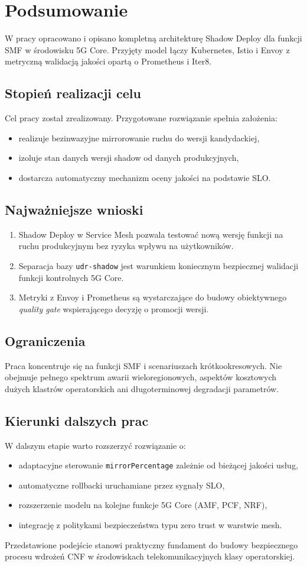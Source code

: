 \chapter{Podsumowanie}
\label{chap:podsumowanie}
W pracy opracowano i opisano kompletną architekturę Shadow Deploy dla funkcji SMF w środowisku 5G Core. Przyjęty model łączy Kubernetes, Istio i Envoy z metryczną walidacją jakości opartą o Prometheus i Iter8.

\section{Stopień realizacji celu}
Cel pracy został zrealizowany. Przygotowane rozwiązanie spełnia założenia:
\begin{itemize}
    \item realizuje bezinwazyjne mirrorowanie ruchu do wersji kandydackiej,
    \item izoluje stan danych wersji shadow od danych produkcyjnych,
    \item dostarcza automatyczny mechanizm oceny jakości na podstawie SLO.
\end{itemize}

\section{Najważniejsze wnioski}
\begin{enumerate}
    \item Shadow Deploy w Service Mesh pozwala testować nową wersję funkcji na ruchu produkcyjnym bez ryzyka wpływu na użytkowników.
    \item Separacja bazy \texttt{udr-shadow} jest warunkiem koniecznym bezpiecznej walidacji funkcji kontrolnych 5G Core.
    \item Metryki z Envoy i Prometheus są wystarczające do budowy obiektywnego \emph{quality gate} wspierającego decyzję o promocji wersji.
\end{enumerate}

\section{Ograniczenia}
Praca koncentruje się na funkcji SMF i scenariuszach krótkookresowych. Nie obejmuje pełnego spektrum awarii wieloregionowych, aspektów kosztowych dużych klastrów operatorskich ani długoterminowej degradacji parametrów.

\section{Kierunki dalszych prac}
W dalszym etapie warto rozszerzyć rozwiązanie o:
\begin{itemize}
    \item adaptacyjne sterowanie \texttt{mirrorPercentage} zależnie od bieżącej jakości usług,
    \item automatyczne rollbacki uruchamiane przez sygnały SLO,
    \item rozszerzenie modelu na kolejne funkcje 5G Core (AMF, PCF, NRF),
    \item integrację z politykami bezpieczeństwa typu zero trust w warstwie mesh.
\end{itemize}

Przedstawione podejście stanowi praktyczny fundament do budowy bezpiecznego procesu wdrożeń CNF w środowiskach telekomunikacyjnych klasy operatorskiej.
